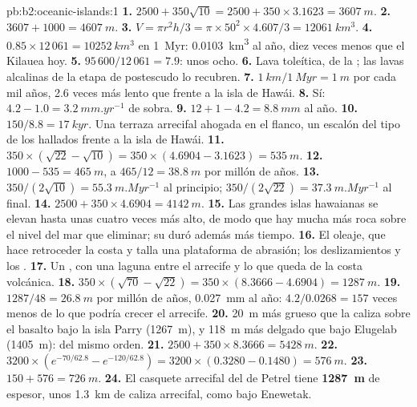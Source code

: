 \begin{solution}{pb:b2:oceanic-islands:1}
\textbf{1.} $2500 + 350\sqrt{10} = 2500 + 350\times3.1623 = \qty{3607}{m}$.
\textbf{2.} $3607 + 1000 = \qty{4607}{m}$.
\textbf{3.} $V = \pi r^2h/3 = \pi\times50^2\times4.607/3 = \qty{12061}{km^3}$.
\textbf{4.} $0.85\times12\,061 = \qty{10252}{km^3}$ en \qty{1}{Myr}: \qty{0.0103}{km^3} al año,
diez veces menos que el Kilauea hoy.
\textbf{5.} $95\,600/12\,061 = 7.9$: unos ocho.
\textbf{6.} Lava toleítica, de la ; las lavas alcalinas de la etapa de postescudo lo
recubren.
\textbf{7.} $\qty{1}{km}/\qty{1}{Myr} = \qty{1}{m}$ por cada mil años, 2.6 veces más lento que frente a
la isla de Hawái.
\textbf{8.} Sí: $4.2 - 1.0 = \qty{3.2}{mm.yr^{-1}}$ de sobra.
\textbf{9.} $12 + 1 - 4.2 = \qty{8.8}{mm}$ al año.
\textbf{10.} $150/8.8 = \qty{17}{kyr}$. Una terraza arrecifal ahogada en el flanco, un escalón del tipo de los
hallados frente a la isla de Hawái.
\textbf{11.} $350\times(\sqrt{22} - \sqrt{10}) = 350\times(4.6904 - 3.1623) = \qty{535}{m}$.
\textbf{12.} $1000 - 535 = \qty{465}{m}$, a $465/12 = \qty{38.8}{m}$ por millón de años.
\textbf{13.} $350/(2\sqrt{10}) = \qty{55.3}{m.Myr^{-1}}$ al principio; $350/(2\sqrt{22}) =
\qty{37.3}{m.Myr^{-1}}$ al final.
\textbf{14.} $2500 + 350\times4.6904 = \qty{4142}{m}$.
\textbf{15.} Las grandes islas hawaianas se elevan hasta unas cuatro veces más alto, de modo que hay mucha más
roca sobre el nivel del mar que eliminar; su  duró además más tiempo.
\textbf{16.} El oleaje, que hace retroceder la costa y talla una plataforma de abrasión; los deslizamientos y los .
\textbf{17.} Un , con una laguna entre el arrecife y lo que queda de la costa volcánica.
\textbf{18.} $350\times(\sqrt{70} - \sqrt{22}) = 350\times(8.3666 - 4.6904) = \qty{1287}{m}$.
\textbf{19.} $1287/48 = \qty{26.8}{m}$ por millón de años, \qty{0.027}{mm} al año: $4.2/0.0268 =
157$ veces menos de lo que podría crecer el arrecife.
\textbf{20.} \qty{20}{m} más grueso que la caliza sobre el basalto bajo la isla Parry
(\qty{1267}{m}), y \qty{118}{m} más delgado que bajo Elugelab (\qty{1405}{m}): del mismo orden.
\textbf{21.} $2500 + 350\times8.3666 = \qty{5428}{m}$.
\textbf{22.} $3200\times(e^{-70/62.8} - e^{-120/62.8}) = 3200\times(0.3280 - 0.1480) =
\qty{576}{m}$.
\textbf{23.} $150 + 576 = \qty{726}{m}$.
\textbf{24.} El casquete arrecifal del  de Petrel tiene \textbf{\qty{1287}{m}} de espesor, unos \qty{1.3}{km}
de caliza arrecifal, como bajo Enewetak.
\end{solution}
